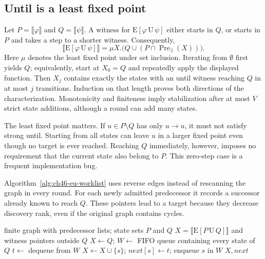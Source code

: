 \subsection{Until is a least fixed point}
\label{sec:ch46-eu}

Let $P=\llbracket\varphi\rrbracket$ and $Q=\llbracket\psi\rrbracket$.
A witness for $\mathrm{E}[\varphi\,\mathrm{U}\,\psi]$ either starts in $Q$, or starts in $P$ and takes a step to a shorter witness.
Consequently,
\[
 \llbracket\mathrm{E}[\varphi\,\mathrm{U}\,\psi]\rrbracket
 =\mu X.\bigl(Q\cup(P\cap\operatorname{Pre}_{\exists}(X))\bigr).
\]
Here $\mu$ denotes the least fixed point under set inclusion.
Iterating from $\emptyset$ first yields $Q$; equivalently, start at $X_0=Q$ and repeatedly apply the displayed function.
Then $X_j$ contains exactly the states with an until witness reaching $Q$ in at most $j$ transitions.
Induction on that length proves both directions of the characterization.
Monotonicity and finiteness imply stabilization after at most $V$ strict state additions, although a round can add many states.

The least fixed point matters.
If $u\in P\setminus Q$ has only $u\to u$, it must not satisfy strong until.
Starting from all states can leave $u$ in a larger fixed point even though no target is ever reached.
Reaching $Q$ immediately, however, imposes no requirement that the current state also belong to $P$.
This zero-step case is a frequent implementation bug.

Algorithm~\ref{alg:ch46-eu-worklist} uses reverse edges instead of rescanning the graph in every round.
For each newly admitted predecessor it records a successor already known to reach $Q$.
These pointers lead to a target because they decrease discovery rank, even if the original graph contains cycles.

\begin{algorithm}[tbp]
\caption{Compute existential until by backward propagation from its target set.}
\label{alg:ch46-eu-worklist}
\begin{pseudocode}
\Require finite graph with predecessor lists; state sets $P$ and $Q$
\Ensure $X=\llbracket\mathrm{E}[P\,\mathrm{U}\,Q]\rrbracket$ and witness pointers outside $Q$
\State $X\gets Q$; $W\gets$ FIFO queue containing every state of $Q$
  \State $t\gets$ dequeue from $W$
      \State $X\gets X\cup\{s\}$; $\mathit{next}[s]\gets t$; enqueue $s$ in $W$
    \EndIf
  \EndFor
\EndWhile
\State \Return $X,\mathit{next}$
\end{pseudocode}
\end{algorithm}

